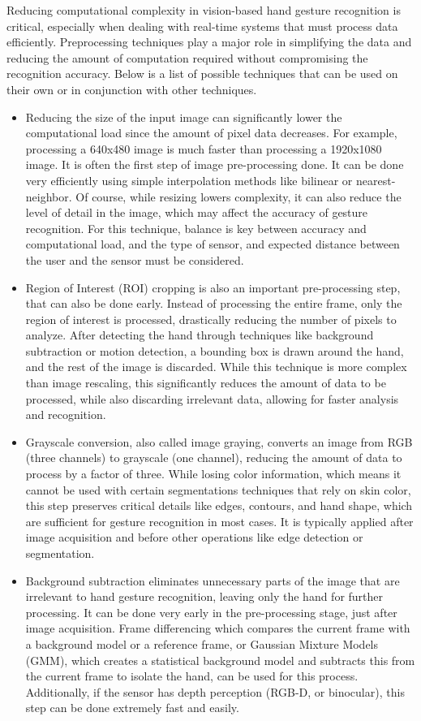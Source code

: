 \documentclass[12pt]{article}
\begin{document}
Reducing computational complexity in vision-based hand gesture recognition is critical, especially when dealing with real-time systems that must process data efficiently. Preprocessing techniques play a major role in simplifying the data and reducing the amount of computation required without compromising the recognition accuracy. Below is a list of possible techniques that can be used on their own or in conjunction with other techniques.
\begin{itemize}
  \item Reducing the size of the input image can significantly lower the computational load since the amount of pixel data decreases. For example, processing a 640x480 image is much faster than processing a 1920x1080 image. It is often the first step of image pre-processing done. It can be done very efficiently using simple interpolation methods like bilinear or nearest-neighbor. Of course, while resizing lowers complexity, it can also reduce the level of detail in the image, which may affect the accuracy of gesture recognition. For this technique, balance is key between accuracy and computational load, and the type of sensor, and expected distance between the user and the sensor must be considered.
  \item Region of Interest (ROI) cropping is also an important pre-processing step, that can also be done early. Instead of processing the entire frame, only the region of interest is processed, drastically reducing the number of pixels to analyze. After detecting the hand through techniques like background subtraction or motion detection, a bounding box is drawn around the hand, and the rest of the image is discarded. While this technique is more complex than image rescaling, this significantly reduces the amount of data to be processed, while also discarding irrelevant data, allowing for faster analysis and recognition. 
  \item Grayscale conversion, also called image graying, converts an image from RGB (three channels) to grayscale (one channel), reducing the amount of data to process by a factor of three. While losing color information, which means it cannot be used with certain segmentations techniques that rely on skin color, this step preserves critical details like edges, contours, and hand shape, which are sufficient for gesture recognition in most cases. It is typically applied after image acquisition and before other operations like edge detection or segmentation.
  \item Background subtraction eliminates unnecessary parts of the image that are irrelevant to hand gesture recognition, leaving only the hand for further processing. It can be done very early in the pre-processing stage, just after image acquisition. Frame differencing which compares the current frame with a background model or a reference frame, or Gaussian Mixture Models (GMM), which creates a statistical background model and subtracts this from the current frame to isolate the hand, can be used for this process. Additionally, if the sensor has depth perception (RGB-D, or binocular), this step can be done extremely fast and easily.

\end{itemize}
\end{document}
